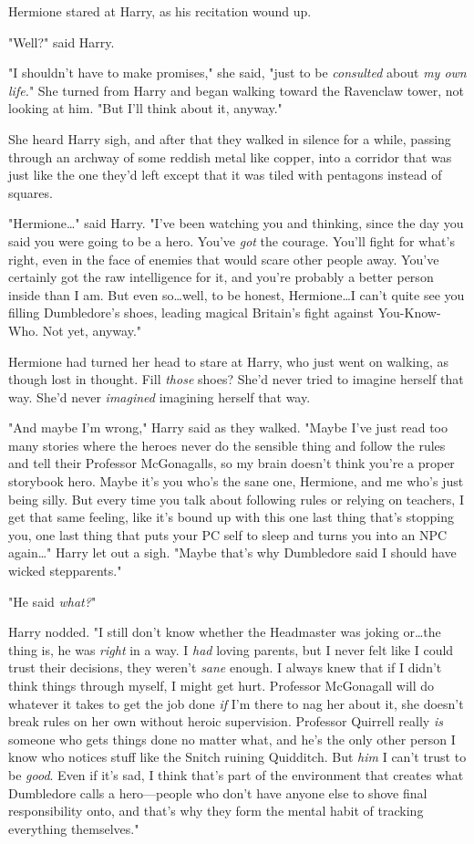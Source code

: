 Hermione stared at Harry, as his recitation wound up.

"Well?" said Harry.

"I shouldn't have to make promises," she said, "just to be \emph{consulted}
about \emph{my own life.}" She turned from Harry and began walking toward the
Ravenclaw tower, not looking at him. "But I'll think about it, anyway."

She heard Harry sigh, and after that they walked in silence for a while,
passing through an archway of some reddish metal like copper, into a corridor
that was just like the one they'd left except that it was tiled with pentagons
instead of squares.

"Hermione…" said Harry. "I've been watching you and thinking, since the
day you said you were going to be a hero. You've \emph{got} the courage. You'll
fight for what's right, even in the face of enemies that would scare other
people away. You've certainly got the raw intelligence for it, and you're
probably a better person inside than I am. But even so…well, to be
honest, Hermione…I can't quite see you filling Dumbledore's shoes,
leading magical Britain's fight against You-Know-Who. Not yet, anyway."

Hermione had turned her head to stare at Harry, who just went on walking, as
though lost in thought. Fill \emph{those} shoes? She'd never tried to imagine
herself that way. She'd never \emph{imagined} imagining herself that way.

"And maybe I'm wrong," Harry said as they walked. "Maybe I've just read too
many stories where the heroes never do the sensible thing and follow the rules
and tell their Professor McGonagalls, so my brain doesn't think you're a proper
storybook hero. Maybe it's you who's the sane one, Hermione, and me who's just
being silly. But every time you talk about following rules or relying on
teachers, I get that same feeling, like it's bound up with this one last thing
that's stopping you, one last thing that puts your PC self to sleep and turns
you into an NPC again…" Harry let out a sigh. "Maybe that's why
Dumbledore said I should have wicked stepparents."

"He said \emph{what?}"

Harry nodded. "I still don't know whether the Headmaster was joking or…the
thing is, he was \emph{right} in a way. I \emph{had} loving parents, but I
never felt like I could trust their decisions, they weren't \emph{sane} enough.
I always knew that if I didn't think things through myself, I might get hurt.
Professor McGonagall will do whatever it takes to get the job done \emph{if}
I'm there to nag her about it, she doesn't break rules on her own without
heroic supervision. Professor Quirrell really \emph{is} someone who gets things
done no matter what, and he's the only other person I know who notices stuff
like the Snitch ruining Quidditch. But \emph{him} I can't trust to be
\emph{good}. Even if it's sad, I think that's part of the environment that
creates what Dumbledore calls a hero—people who don't have anyone else to
shove final responsibility onto, and that's why they form the mental habit of
tracking everything themselves."

